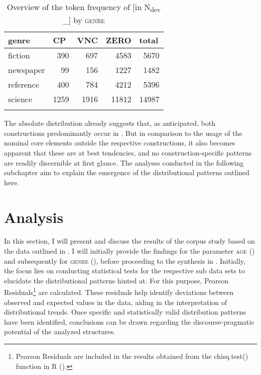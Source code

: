 \documentclass[output=paper,colorlinks,citecolor=brown]{langscibook}
\begin{document}
\begin{table}
\centering
\begin{tabularx}{0.6\textwidth}{lrrrr}
\lsptoprule
{genre} &  \multicolumn{1}{l}{CP} &  \multicolumn{1}{l}{VNC} &  \multicolumn{1}{l}{ZERO} &  \multicolumn{1}{l}{total}\\
\midrule
fiction & {390} & {697} & {4583} & {5670}\\
newspaper & {99} & {156} & {1227} & {1482}\\
reference & {400} & {784} & {4212} & {5396}\\
science & {1259} & {1916} & {11812} & {14987}\\
\lspbottomrule
\end{tabularx}
\caption{Overview of the token frequency of [in \textup{N}\textup{\textsubscript{dev}} \textup{\_] by} \textsc{genre}}
\label{tab:fleissner:4}
\end{table} 

The absolute distribution already suggests that, as anticipated, both constructions predominantly occur in . But in comparison to the usage of the nominal core elements outside the respective constructions, it also becomes apparent that these are at best tendencies, and no construction-specific patterns are readily discernible at first glance. The analyses conducted in the following subchapter aim to explain the emergence of the distributional patterns outlined here. 


\section{Analysis}\label{sec:fleissner:4}

In this section, I will present and discuss the results of the corpus study based on the data outlined in . I will initially provide the findings for the parameter \textsc{age} () and subsequently for \textsc{genre} (), before proceeding to the synthesis in . Initially, the focus lies on conducting statistical tests for the respective sub data sets to elucidate the distributional patterns hinted at. For this purpose, Pearson Residuals\footnote{Pearson Residuals are included in the results obtained from the chisq.test() function in R (\citealt{R}).}  are calculated. These residuals help identify deviations between observed and expected values in the data, aiding in the interpretation of distributional trends. Once specific and statistically valid distribution patterns have been identified, conclusions can be drawn regarding the discourse-pragmatic potential of the analyzed structures.     
\end{document}
